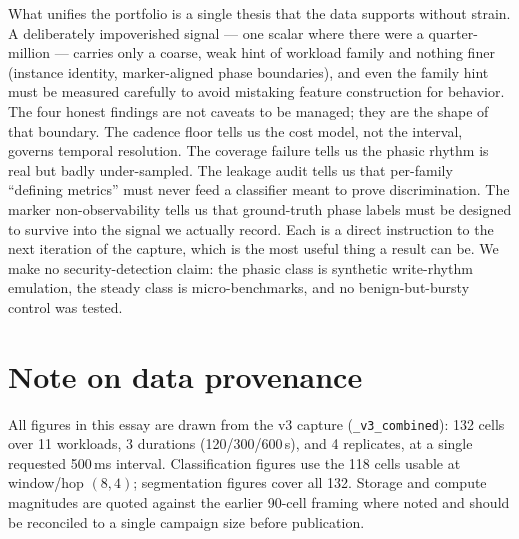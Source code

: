 \documentclass[11pt]{article}
\begin{document}
What unifies the portfolio is a single thesis that the data supports without
strain. A deliberately impoverished signal --- one scalar where there were a
quarter-million --- carries only a coarse, weak hint of workload family and
nothing finer (instance identity, marker-aligned phase boundaries), and even the
family hint must be measured carefully to avoid mistaking feature construction
for behavior. The four honest findings are not caveats to be managed; they are
the shape of that boundary. The cadence floor tells us the cost model, not the
interval, governs temporal resolution. The coverage failure tells us the phasic
rhythm is real but badly under-sampled. The leakage audit tells us that
per-family ``defining metrics'' must never feed a classifier meant to prove
discrimination. The marker non-observability tells us that ground-truth phase
labels must be designed to survive into the signal we actually record. Each is a
direct instruction to the next iteration of the capture, which is the most useful
thing a result can be. We make no security-detection claim: the phasic class is
synthetic write-rhythm emulation, the steady class is micro-benchmarks, and no
benign-but-bursty control was tested.

\section*{Note on data provenance}

All figures in this essay are drawn from the v3 capture
(\texttt{\_v3\_combined}): 132 cells over 11 workloads, 3 durations
(120/300/600\,s), and 4 replicates, at a single requested 500\,ms interval.
Classification figures use the 118 cells usable at window/hop $(8,4)$;
segmentation figures cover all 132. Storage and compute magnitudes are quoted
against the earlier 90-cell framing where noted and should be reconciled to a
single campaign size before publication.
\end{document}
